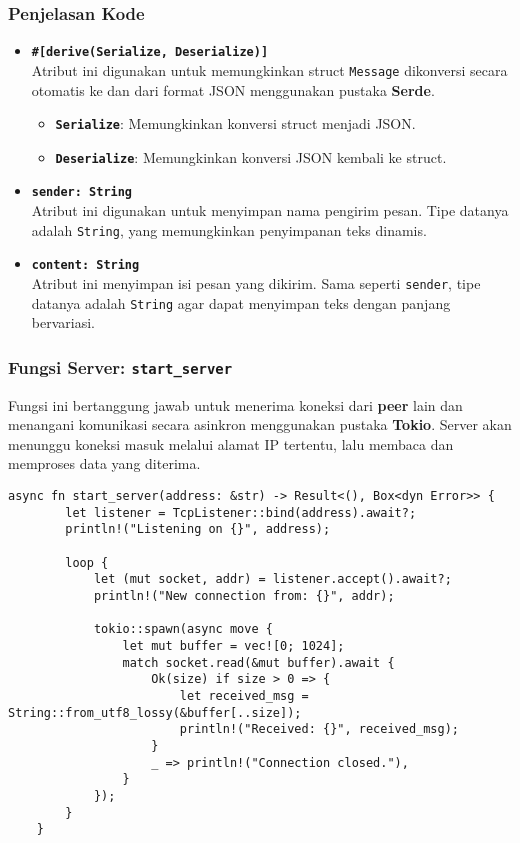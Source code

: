 \subsubsection{Penjelasan Kode}
\begin{itemize}
	\item \textbf{\texttt{\#[derive(Serialize, Deserialize)]}} \\
	Atribut ini digunakan untuk memungkinkan struct \texttt{Message} dikonversi secara otomatis ke dan dari format JSON menggunakan pustaka \textbf{Serde}. 
	\begin{itemize}
		\item \textbf{\texttt{Serialize}}: Memungkinkan konversi struct menjadi JSON.
		\item \textbf{\texttt{Deserialize}}: Memungkinkan konversi JSON kembali ke struct.
	\end{itemize}
	
	\item \textbf{\texttt{sender: String}} \\
	Atribut ini digunakan untuk menyimpan nama pengirim pesan. Tipe datanya adalah \texttt{String}, yang memungkinkan penyimpanan teks dinamis.
	
	\item \textbf{\texttt{content: String}} \\
	Atribut ini menyimpan isi pesan yang dikirim. Sama seperti \texttt{sender}, tipe datanya adalah \texttt{String} agar dapat menyimpan teks dengan panjang bervariasi.
	
\end{itemize}



\subsubsection{Fungsi Server: \texttt{start\_server}}

Fungsi ini bertanggung jawab untuk menerima koneksi dari \textbf{peer} lain dan menangani komunikasi secara asinkron menggunakan pustaka \textbf{Tokio}. Server akan menunggu koneksi masuk melalui alamat IP tertentu, lalu membaca dan memproses data yang diterima.

\begin{lstlisting}[style=RustStyle]
	async fn start_server(address: &str) -> Result<(), Box<dyn Error>> {
		let listener = TcpListener::bind(address).await?;
		println!("Listening on {}", address);
		
		loop {
			let (mut socket, addr) = listener.accept().await?;
			println!("New connection from: {}", addr);
			
			tokio::spawn(async move {
				let mut buffer = vec![0; 1024];
				match socket.read(&mut buffer).await {
					Ok(size) if size > 0 => {
						let received_msg = String::from_utf8_lossy(&buffer[..size]);
						println!("Received: {}", received_msg);
					}
					_ => println!("Connection closed."),
				}
			});
		}
	}
\end{lstlisting}

